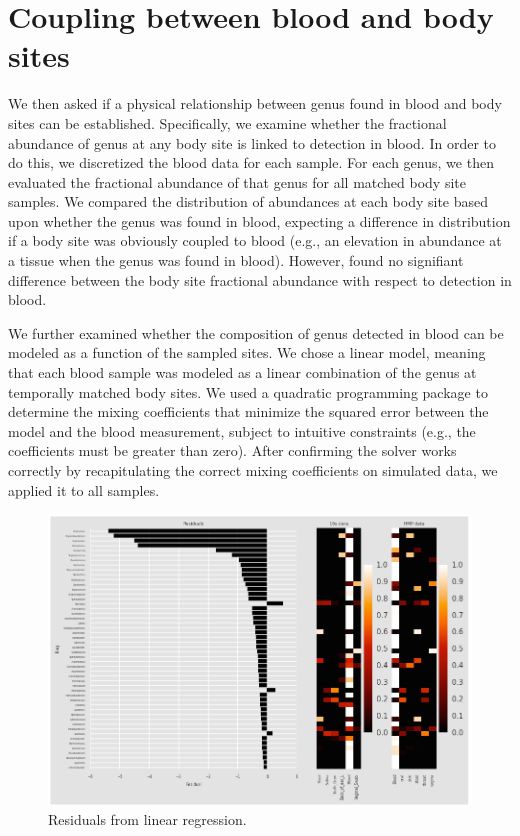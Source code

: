 \section{Coupling between blood and body sites}

We then asked if a physical relationship between genus found in blood and  body sites can be established. Specifically, we examine whether the fractional abundance of genus at any body site is linked to detection in blood. In order to do this, we discretized the blood data for each sample. For each genus, we then evaluated the fractional abundance of that genus for all matched body site samples. We compared the distribution of abundances at each body site based upon whether the genus was found in blood, expecting a difference in distribution if a body site was obviously coupled to blood (e.g., an elevation in abundance at a tissue when the genus was found in blood). However, found no signifiant difference between the body site fractional abundance with respect to detection in blood. 

We further examined whether the composition of genus detected in blood can be modeled as a function of the sampled sites. We chose a linear model, meaning that each blood sample was modeled as a linear combination of the genus at temporally matched body sites. We used a quadratic programming package to determine the mixing coefficients that minimize the squared error between the model and the blood measurement, subject to intuitive constraints (e.g., the coefficients must be greater than zero). After confirming the solver works correctly by recapitulating the correct mixing coefficients on simulated data, we applied it to all samples. 

\begin{figure}
\center\includegraphics[width=150mm,scale=0.5]{Figures/Fig14_2}
\caption{Residuals from linear regression.}
\label{fig:Fig14_2}
\end{figure}

